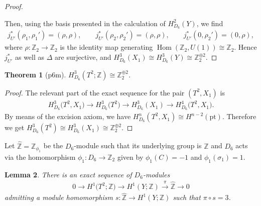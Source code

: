 \documentclass[11pt]{article}
\newtheorem{thm}{Theorem}[section]
\newtheorem{lem}[thm]{Lemma}
\theoremstyle{definition}
\newcommand{\Z}{\mathbb{Z}}
\newcommand{\pt}{\mathrm{pt}}
\begin{document}
\begin{proof}
\begin{itemize}
\end{itemize}
Then, using the basis presented in the calculation of $H^2_{D_6}(Y)$, we f\/ind
\begin{gather*}
j_{U'}^*(\rho_1, \rho_1') = (\rho, \rho), \qquad j_{U'}^*(\rho_2, \rho_2') = (\rho, \rho), \qquad
j_{U'}^*(0, \rho_2') = (0, \rho),
\end{gather*}
where $\rho\colon \Z_2 \to \Z_2$ is the identity map generating $\operatorname{Hom}(\Z_2, U(1)) \cong \Z_2$. Hence $j_{U'}^*$ as well as $\Delta$ are surjective, and $H^3_{D_6}(X_1) \cong H^3_{D_6}(Y) \cong \Z_2^{\oplus 2}$.
\end{proof}

\begin{thm}[\textsf{p6m}]
$H^3_{D_6}(T^2; \Z) \cong \Z_2^{\oplus 2}$.
\end{thm}

\begin{proof}
The relevant part of the exact sequence for the pair $(T^2, X_1)$ is
\begin{gather*}
H^3_{D_6}\big(T^2, X_1\big) \to H^3_{D_6}\big(T^2\big) \to H^3_{D_6}(X_1) \to H^4_{D_6}\big(T^2, X_1\big).
\end{gather*}
By means of the excision axiom, we have $H^n_{D_6}(T^2, X_1) \cong H^{n-2}(\pt)$. Therefore we get $H^3_{D_6}(T^2) \cong H^3_{D_6}(X_1) \cong \Z_2^{\oplus 2}$.
\end{proof}

Let $\hat{\Z} = \Z_{\phi_1}$ be the $D_6$-module such that its underlying group is $\Z$ and $D_6$ acts via the homomorphism $\phi_1\colon D_6 \to \Z_2$ given by $\phi_1(C) = -1$ and $\phi_1(\sigma_1) = 1$.

\begin{lem} \label{lem:p6m_short_exact_sequence_of_modules}
There is an exact sequence of $D_6$-modules
\begin{gather*}
0 \to H^1\big(T^2; \Z\big) \to H^1(Y; \Z) \overset{\pi}{\to} \hat{\Z} \to 0
\end{gather*}
admitting a module homomorphism $s\colon \hat{\Z} \to H^1(Y; \Z)$ such that $\pi \circ s = 3$.
\end{lem}
\end{document}
